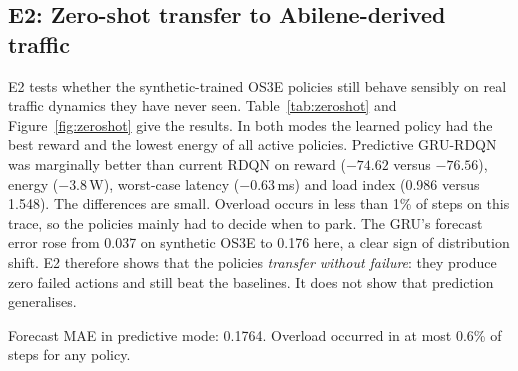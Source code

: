 \subsection{E2: Zero-shot transfer to Abilene-derived traffic}
\label{sec:res-zeroshot}

E2 tests whether the synthetic-trained OS3E policies still behave sensibly on real traffic dynamics they have never seen. Table~\ref{tab:zeroshot} and Figure~\ref{fig:zeroshot} give the results. In both modes the learned policy had the best reward and the lowest energy of all active policies. Predictive GRU-RDQN was marginally better than current RDQN on reward ($-74.62$ versus $-76.56$), energy ($-3.8$\,W), worst-case latency ($-0.63$\,ms) and load index (0.986 versus 1.548). The differences are small. Overload occurs in less than 1\% of steps on this trace, so the policies mainly had to decide when to park. The GRU's forecast error rose from 0.037 on synthetic OS3E to 0.176 here, a clear sign of distribution shift. E2 therefore shows that the policies \emph{transfer without failure}: they produce zero failed actions and still beat the baselines. It does not show that prediction generalises.

\begin{table}[htbp]
\centering
\caption{E2 zero-shot results on the Abilene-derived OS3E test trace (models trained on synthetic OS3E only).}
\label{tab:zeroshot}
\small
{}
\par\smallskip\footnotesize Forecast MAE in predictive mode: 0.1764. Overload occurred in at most 0.6\% of steps for any policy.
\end{table}

